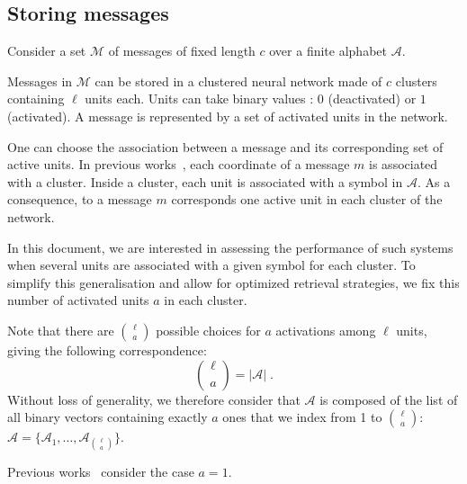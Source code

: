 \documentclass[english,10pt,twocolumn]{IEEEtran}
\theoremstyle{definition}
\begin{document}
	
	\subsection{Storing messages}
	
	Consider a set $\mathcal{M}$ of messages of fixed length $c$ over a finite alphabet $\mathcal{A}$.
	
	Messages in $\mathcal{M}$ can be stored in a clustered neural network made of $c$ clusters containing $\ell$ units each. Units can take binary values : $0$ (deactivated) or $1$ (activated). A message is represented by a set of activated units in the network. %
	
        One can choose the association between a message and its corresponding set of active units. In previous works~\cite{GriBer20114, GriBer20122}, each coordinate of a message $m$ is associated with a cluster. Inside a cluster, each unit is associated with a symbol in $\mathcal{A}$. As a consequence, to a message $m$ corresponds one active unit in each cluster of the network.

        In this document, we are interested in assessing the performance of such systems when several units are associated with a given symbol for each cluster. To simplify this generalisation and allow for optimized retrieval strategies, we fix this number of activated units $a$ in each cluster.
        
        Note that there are $\binom{\ell}{a}$ possible choices for $a$ activations among $\ell$ units, giving the following correspondence:
\[
\binom{\ell}{a} = | \mathcal{A} |\;.
\]
Without loss of generality, we therefore consider that $\mathcal{A}$ is composed of the list of all binary vectors containing exactly $a$ ones that we index from 1 to $\binom{\ell}{a}$: $\mathcal{A} = \{\mathcal{A}_1,\dots,\mathcal{A}_{\binom{\ell}{a}}\}$.

Previous works~\cite{GriBer20114,GriBer20122} consider the case $a=1$.
	
	 
	
	
\end{document}
